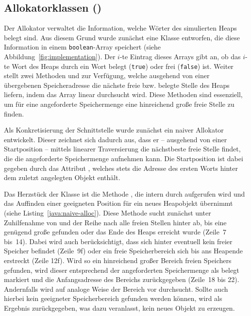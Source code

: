 \subsection{Allokatorklassen ()}
\label{sub:allocator}
Der Allokator verwaltet die Information, welche Wörter des simulierten Heaps belegt sind.
Aus diesem Grund wurde zunächst eine Klasse  entworfen, die diese Information in einem \texttt{boolean}-Array speichert (siehe Abbildung~\ref{fig:implementation}).
Der $i$-te Eintrag dieses Arrays gibt an, ob das $i$-te Wort des Heaps durch ein Wort belegt (\texttt{true}) oder frei (\texttt{false}) ist.
Weiter stellt  zwei Methoden  und  zur Verfügung, welche ausgehend von einer übergebenen Speicheradresse die nächste freie bzw. belegte Stelle des Heaps liefern, indem das Array linear durchsucht wird.
Diese Methoden sind essenziell, um für eine angeforderte Speichermenge eine hinreichend große freie Stelle zu finden.

Als Konkretisierung der Schnittstelle  wurde zunächst ein naiver Allokator entwickelt.
Dieser zeichnet sich dadurch aus, dass er -- ausgehend von einer Startposition -- mittels linearer Traversierung die nächstbeste freie Stelle findet, die die angeforderte Speichermenge aufnehmen kann.
Die Startposition ist dabei gegeben durch das Attribut , welches stets die Adresse des ersten Worts hinter dem zuletzt angelegten Objekt enthält.

Das Herzstück der Klasse  ist die Methode , die intern durch  aufgerufen wird und das Auffinden einer geeigneten Position für ein neues Heapobjekt übernimmt (siehe Listing~\ref{java:naive-alloc}).
Diese Methode sucht zunächst unter Zuhilfenahme von  und  der Reihe nach alle freien Stellen hinter  ab, bis eine genügend große gefunden oder das Ende des Heaps erreicht wurde (Zeile~7 bis~14).
Dabei wird auch berücksichtigt, dass sich hinter  eventuell kein freier Speicher befindet (Zeile~9f) oder ein freie Speicherbereich sich bis ans Heapende erstreckt (Zeile 12f).
Wird so ein hinreichend großer Bereich freien Speichers gefunden, wird dieser entsprechend der angeforderten Speichermenge als belegt markiert und die Anfangsadresse des Bereichs zurückgegeben (Zeile~18 bis 22).
Andernfalls wird auf analoge Weise der Bereich vor  durchsucht.
Sollte auch hierbei kein geeigneter Speicherbereich gefunden werden können, wird als Ergebnis  zurückgegeben, was  dazu veranlasst, kein neues Objekt zu erzeugen.

